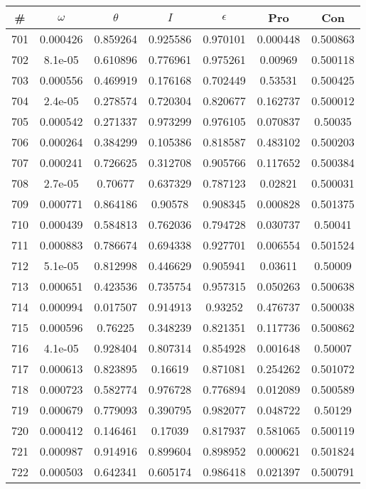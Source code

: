 \newpage
\begin{table}
\begin{tabular}{c|c|c|c|c|c|c}
\# & $\omega$ & $\theta$ & $I$ & $\epsilon$ & Pro & Con\\
\hline
701 & 0.000426 & 0.859264 & 0.925586 & 0.970101 & 0.000448 & 0.500863\\
702 & 8.1e-05 & 0.610896 & 0.776961 & 0.975261 & 0.00969 & 0.500118\\
703 & 0.000556 & 0.469919 & 0.176168 & 0.702449 & 0.53531 & 0.500425\\
704 & 2.4e-05 & 0.278574 & 0.720304 & 0.820677 & 0.162737 & 0.500012\\
705 & 0.000542 & 0.271337 & 0.973299 & 0.976105 & 0.070837 & 0.50035\\
706 & 0.000264 & 0.384299 & 0.105386 & 0.818587 & 0.483102 & 0.500203\\
707 & 0.000241 & 0.726625 & 0.312708 & 0.905766 & 0.117652 & 0.500384\\
708 & 2.7e-05 & 0.70677 & 0.637329 & 0.787123 & 0.02821 & 0.500031\\
709 & 0.000771 & 0.864186 & 0.90578 & 0.908345 & 0.000828 & 0.501375\\
710 & 0.000439 & 0.584813 & 0.762036 & 0.794728 & 0.030737 & 0.50041\\
711 & 0.000883 & 0.786674 & 0.694338 & 0.927701 & 0.006554 & 0.501524\\
712 & 5.1e-05 & 0.812998 & 0.446629 & 0.905941 & 0.03611 & 0.50009\\
713 & 0.000651 & 0.423536 & 0.735754 & 0.957315 & 0.050263 & 0.500638\\
714 & 0.000994 & 0.017507 & 0.914913 & 0.93252 & 0.476737 & 0.500038\\
715 & 0.000596 & 0.76225 & 0.348239 & 0.821351 & 0.117736 & 0.500862\\
716 & 4.1e-05 & 0.928404 & 0.807314 & 0.854928 & 0.001648 & 0.50007\\
717 & 0.000613 & 0.823895 & 0.16619 & 0.871081 & 0.254262 & 0.501072\\
718 & 0.000723 & 0.582774 & 0.976728 & 0.776894 & 0.012089 & 0.500589\\
719 & 0.000679 & 0.779093 & 0.390795 & 0.982077 & 0.048722 & 0.50129\\
720 & 0.000412 & 0.146461 & 0.17039 & 0.817937 & 0.581065 & 0.500119\\
721 & 0.000987 & 0.914916 & 0.899604 & 0.898952 & 0.000621 & 0.501824\\
722 & 0.000503 & 0.642341 & 0.605174 & 0.986418 & 0.021397 & 0.500791\\

\end{tabular}
\end{table}
